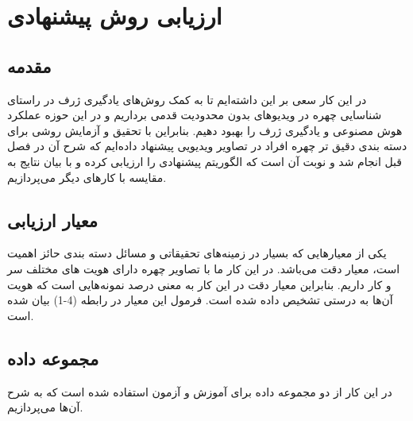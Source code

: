 \chapter{ارزیابی روش پیشنهادی}
\section{مقدمه}

در این کار سعی بر این داشته‌ایم تا به کمک روش‌های یادگیری ژرف در راستای شناسایی چهره در ویدیوهای بدون محدودیت قدمی برداریم و در این حوزه عملکرد هوش مصنوعی و یادگیری ژرف را بهبود دهیم. بنابراین با تحقیق و آزمایش روشی برای دسته بندی دقیق تر چهره افراد در تصاویر ویدیویی پیشنهاد داده‌ایم که شرح آن در فصل قبل انجام شد و نوبت آن است که الگوریتم پیشنهادی را ارزیابی کرده و با بیان نتایج به مقایسه با کارهای دیگر می‌پردازیم.
\section{معیار ارزیابی}

یکی از معیارهایی که بسیار در زمینه‌های تحقیقاتی و مسائل دسته بندی حائز اهمیت است، معیار دقت می‌باشد. در این کار ما با تصاویر چهره دارای هویت های مختلف سر و کار داریم. بنابراین معیار دقت در این کار به معنی درصد نمونه‌هایی است که هویت آن‌ها به درستی تشخیص داده شده است. فرمول این معیار در رابطه (4-1) بیان شده است.
‌
\section{مجموعه داده}
در این کار از دو مجموعه داده برای آموزش و آزمون استفاده شده است که به شرح آن‌ها می‌پردازیم.
